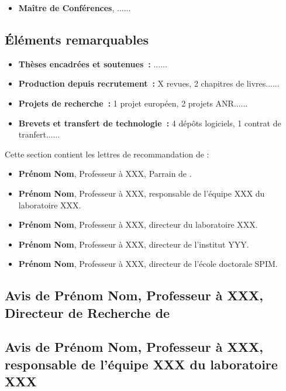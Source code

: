 \documentclass[french]{hdrapplication}
\begin{document}
\begin{itemize}
\item \textbf{Maître de Conférences}, ......
\end{itemize}

\subsection{\'Eléments remarquables}

\begin{itemize}
\item \textbf{Thèses encadrées et soutenues~:} ......
\item \textbf{Production depuis recrutement~:} X revues, 2 chapitres de livres......
\item \textbf{Projets de recherche~:} 1 projet européen, 2 projets ANR......
\item \textbf{Brevets et transfert de technologie~:} 4 dépôts logiciels, 1 contrat de tranfert......
\end{itemize}


Cette section contient les lettres de recommandation de :


\begin{itemize}
\item \textbf{Prénom Nom}, Professeur à XXX, Parrain de .\parbreak
\item \textbf{Prénom Nom}, Professeur à XXX, responsable de l'équipe XXX du laboratoire XXX.\parbreak
\item \textbf{Prénom Nom}, Professeur à XXX, directeur du laboratoire XXX.\parbreak
\item \textbf{Prénom Nom}, Professeur à XXX, directeur de l'institut YYY.\parbreak
\item \textbf{Prénom Nom}, Professeur à XXX, directeur de l'école doctorale SPIM.
\end{itemize}

\pagebreak

\subsection{Avis de Prénom Nom, Professeur à XXX, Directeur de Recherche de }


\subsection{Avis de Prénom Nom, Professeur à XXX, responsable de l'équipe XXX du laboratoire XXX}
\end{document}

